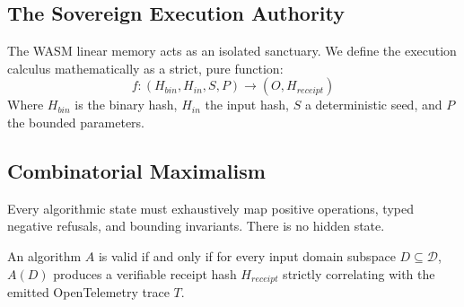 \subsection{The Sovereign Execution Authority}
The WASM linear memory acts as an isolated sanctuary. We define the execution calculus mathematically as a strict, pure function:
\[ f : (H_{bin}, H_{in}, S, P) \to (O, H_{receipt}) \]
Where $H_{bin}$ is the binary hash, $H_{in}$ the input hash, $S$ a deterministic seed, and $P$ the bounded parameters.

\subsection{Combinatorial Maximalism}
Every algorithmic state must exhaustively map positive operations, typed negative refusals, and bounding invariants. There is no hidden state. 
\begin{theorem}
An algorithm $A$ is valid if and only if for every input domain subspace $D \subseteq \mathcal{D}$, $A(D)$ produces a verifiable receipt hash $H_{receipt}$ strictly correlating with the emitted OpenTelemetry trace $T$.
\end{theorem}
